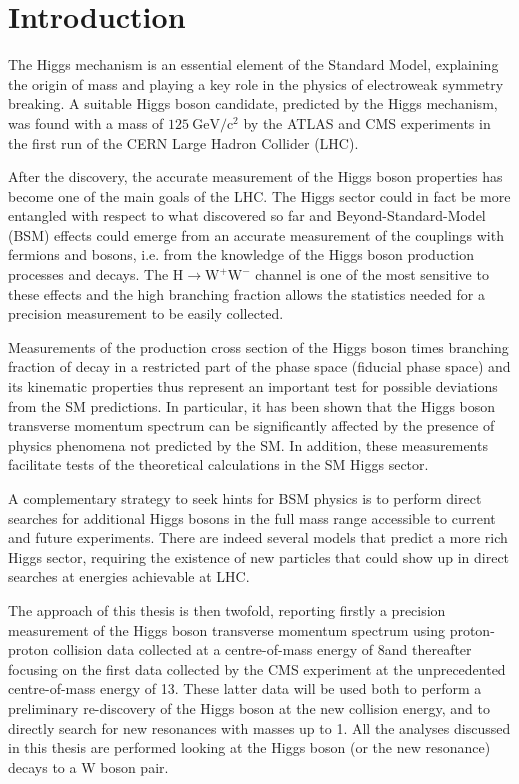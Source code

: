 \chapter*{Introduction}
\thispagestyle{empty}

The Higgs mechanism is an essential element of the Standard Model, explaining the origin of mass and playing a key role in the physics of electroweak symmetry breaking. A suitable Higgs boson candidate, predicted by the Higgs mechanism, was found with a mass of $125~\mathrm{GeV/c^2}$ by the ATLAS and CMS experiments in the first run of the CERN Large Hadron Collider (LHC).

After the discovery, the accurate measurement of the Higgs boson properties has become one of the main goals of the LHC. The Higgs sector could in fact be more entangled with respect to what discovered so far and Beyond-Standard-Model (BSM) effects could emerge from an accurate measurement of the couplings with fermions and bosons, i.e. from the knowledge of the Higgs boson production processes and decays. The $\mathrm{H \to W^+W^-}$ channel is one of the most sensitive to these effects and the high branching fraction allows the statistics needed for a precision measurement to be easily collected.

Measurements of the production cross section of the Higgs boson times branching fraction of decay in a restricted part of the phase space (fiducial phase space) and its kinematic properties thus represent an important test for possible deviations from the SM predictions.
In particular, it has been shown that the Higgs boson transverse momentum spectrum can be significantly affected by the presence of physics phenomena not predicted by the SM. In addition, these measurements facilitate tests of the theoretical calculations in the SM Higgs sector.

A complementary strategy to seek hints for BSM physics is to perform direct searches for additional Higgs bosons in the full mass range accessible to current and future experiments. There are indeed several models that predict a more rich Higgs sector, requiring the existence of new particles that could show up in direct searches at energies achievable at LHC.

The approach of this thesis is then twofold, reporting firstly a precision measurement of the Higgs boson transverse momentum spectrum using proton-proton collision data collected at a centre-of-mass energy of 8\TeV and thereafter focusing on the first data collected by the CMS experiment at the unprecedented centre-of-mass energy of 13\TeV. These latter data will be used both to perform a preliminary re-discovery of the Higgs boson at the new collision energy, and to directly search for new resonances with masses up to 1\TeV. All the analyses discussed in this thesis are performed looking at the Higgs boson (or the new resonance) decays to a W boson pair.

